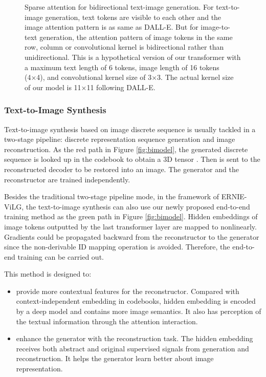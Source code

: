 \documentclass{article}
\begin{document}
\begin{figure}[htb]
    \centering
    \caption{Sparse attention for bidirectional text-image generation. For text-to-image generation, text tokens are visible to each other and the image attention pattern is as same as DALL-E. But for image-to-text generation, the attention pattern of image tokens in the same row, column or convolutional kernel is bidirectional rather than unidirectional. 
    This is a hypothetical version of our transformer with a maximum text length of 6 tokens, image length of 16 tokens (4×4), and convolutional kernel size of 3×3. The actual kernel size of our model is 11×11 following DALL-E.}
    \label{fig:sparse_attention}
\end{figure}

\subsubsection{Text-to-Image Synthesis}
Text-to-image synthesis based on image discrete sequence is usually tackled in a two-stage pipeline: discrete representation sequence generation and image reconstruction. As the red path in Figure \ref{fig:bimodel}, the generated discrete sequence is looked up in the codebook to obtain a 3D tensor . Then  is sent to the reconstructed decoder to be restored into an image. The generator and the reconstructor are trained independently. 

Besides the traditional two-stage pipeline mode, in the framework of ERNIE-ViLG, the text-to-image synthesis can also use our newly proposed end-to-end training method as the green path in Figure \ref{fig:bimodel}. Hidden embeddings of image tokens outputted by the last transformer layer are mapped to  nonlinearly. Gradients could be propagated backward from the reconstructor to the generator since the non-derivable ID mapping operation is avoided. Therefore, the end-to-end training can be carried out.

This method is designed to:
\begin{itemize}
\item provide more contextual features for the reconstructor. Compared with context-independent embedding in codebooks, hidden embedding is encoded by a deep model and contains more image semantics. It also has perception of the textual information through the attention interaction.
\item enhance the generator with the reconstruction task. The hidden embedding receives both abstract and original supervised signals from generation and reconstruction. It helps the generator learn better about image representation.
\end{itemize}
\end{document}

